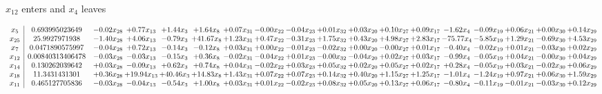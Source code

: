 \documentclass[9pt]{article}
\begin{document}
 $ x_{12} $ enters and $ x_{4} $ leaves 

 \[\begin{array}{c| c c@{\hskip 2pt} c@{\hskip 2pt} c@{\hskip 2pt} c@{\hskip 2pt} c@{\hskip 2pt} c@{\hskip 2pt} c@{\hskip 2pt} c@{\hskip 2pt} c@{\hskip 2pt} c@{\hskip 2pt} c@{\hskip 2pt} c@{\hskip 2pt} c@{\hskip 2pt} c@{\hskip 2pt} c@{\hskip 2pt} c@{\hskip 2pt} }
 x_{5}   &  0.693995023649 & -0.02 x_{28} & +  0.77 x_{13} & +  1.44 x_{3} & +  1.64 x_{8} & +  0.07 x_{31} & -0.00 x_{22} & -0.04 x_{23} & +  0.01 x_{32} & +  0.03 x_{20} & +  0.10 x_{27} & +  0.09 x_{17} & -1.62 x_{4} & -0.09 x_{19} & +  0.06 x_{21} & +  0.00 x_{30} & +  0.14 x_{29}\\
 x_{25}   &  25.9927971938 & -1.40 x_{28} & +  4.06 x_{13} & -0.79 x_{3} & + 41.67 x_{8} & +  1.23 x_{31} & +  0.47 x_{22} & -0.31 x_{23} & +  1.75 x_{32} & +  0.43 x_{20} & +  4.98 x_{27} & +  2.83 x_{17} & -75.77 x_{4} & -5.85 x_{19} & +  1.29 x_{21} & -0.69 x_{30} & +  4.53 x_{29}\\
 x_{7}   &  0.0471890575997 & -0.04 x_{28} & +  0.72 x_{13} & -0.14 x_{3} & -0.12 x_{8} & +  0.03 x_{31} & +  0.00 x_{22} & -0.01 x_{23} & -0.02 x_{32} & +  0.00 x_{20} & -0.00 x_{27} & +  0.01 x_{17} & -0.40 x_{4} & -0.02 x_{19} & +  0.01 x_{21} & -0.03 x_{30} & +  0.02 x_{29}\\
 x_{12}   &  0.00840313406478 & -0.03 x_{28} & -0.03 x_{13} & -0.15 x_{3} & +  0.36 x_{8} & -0.02 x_{31} & -0.04 x_{22} & +  0.01 x_{23} & -0.00 x_{32} & -0.04 x_{20} & +  0.02 x_{27} & +  0.03 x_{17} & -0.99 x_{4} & -0.05 x_{19} & +  0.04 x_{21} & -0.00 x_{30} & +  0.04 x_{29}\\
 x_{14}   &  0.130262039642 & +  0.03 x_{28} & -0.09 x_{13} & +  0.62 x_{3} & +  0.74 x_{8} & +  0.04 x_{31} & -0.02 x_{22} & +  0.03 x_{23} & +  0.05 x_{32} & +  0.02 x_{20} & +  0.05 x_{27} & +  0.02 x_{17} & +  0.28 x_{4} & -0.05 x_{19} & +  0.03 x_{21} & -0.02 x_{30} & +  0.06 x_{29}\\
 x_{18}   &  11.3431431301 & +  0.36 x_{28} & + 19.94 x_{13} & + 40.46 x_{3} & + 14.83 x_{8} & +  1.43 x_{31} & +  0.07 x_{22} & +  0.07 x_{23} & +  0.14 x_{32} & +  0.40 x_{20} & +  1.15 x_{27} & +  1.25 x_{17} & -1.01 x_{4} & -1.24 x_{19} & +  0.97 x_{21} & +  0.06 x_{30} & +  1.59 x_{29}\\
 x_{11}   &  0.465127705836 & -0.03 x_{28} & -0.04 x_{13} & -0.54 x_{3} & +  1.00 x_{8} & +  0.03 x_{31} & +  0.01 x_{22} & -0.02 x_{23} & +  0.08 x_{32} & +  0.05 x_{20} & +  0.13 x_{27} & +  0.06 x_{17} & -0.80 x_{4} & -0.11 x_{19} & -0.01 x_{21} & -0.03 x_{30} & +  0.12 x_{29}\\

\end{array}\]
\end{document}
